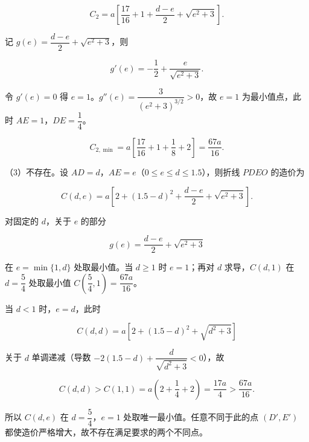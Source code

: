 \begin{answer}
\nopagebreak[4]
\[C_2=a\left[\frac{17}{16}+1+\frac{d-e}2+\sqrt{e^2+3}\right].\]

记 $g(e)=\dfrac{d-e}2+\sqrt{e^2+3}$，则

\nopagebreak[4]
\[g'(e)=-\frac12+\frac{e}{\sqrt{e^2+3}}.\]

令 $g'(e)=0$ 得 $e=1$。$g''(e)=\dfrac{3}{(e^2+3)^{3/2}}>0$，故 $e=1$ 为最小值点，此时 $AE=1$，$DE=\dfrac14$。

\nopagebreak[4]
\[C_{2,\min}=a\left[\frac{17}{16}+1+\frac18+2\right]=\frac{67a}{16}.\]

（3）不存在。设 $AD=d$，$AE=e$（$0\leqslant e\leqslant d\leqslant1.5$），则折线 $PDEO$ 的造价为

\nopagebreak[4]
\[C(d,e)=a\left[2+(1.5-d)^2+\frac{d-e}2+\sqrt{e^2+3}\right].\]

对固定的 $d$，关于 $e$ 的部分

\nopagebreak[4]
\[g(e)=\frac{d-e}2+\sqrt{e^2+3}\]

在 $e=\min\{1,d\}$ 处取最小值。当 $d\geqslant1$ 时 $e=1$；再对 $d$ 求导，$C(d,1)$ 在 $d=\dfrac54$ 处取最小值 $C\left(\dfrac54,1\right)=\dfrac{67a}{16}$。

当 $d<1$ 时，$e=d$，此时

\nopagebreak[4]
\[C(d,d)=a\left[2+(1.5-d)^2+\sqrt{d^2+3}\right]\]

关于 $d$ 单调递减（导数 $-2(1.5-d)+\dfrac{d}{\sqrt{d^2+3}}<0$），故

\nopagebreak[4]
\[C(d,d)>C(1,1)=a\left(2+\frac14+2\right)=\frac{17a}4>\frac{67a}{16}.\]

所以 $C(d,e)$ 在 $d=\dfrac54$，$e=1$ 处取唯一最小值。任意不同于此的点 $(D',E')$ 都使造价严格增大，故不存在满足要求的两个不同点。


\end{answer}
